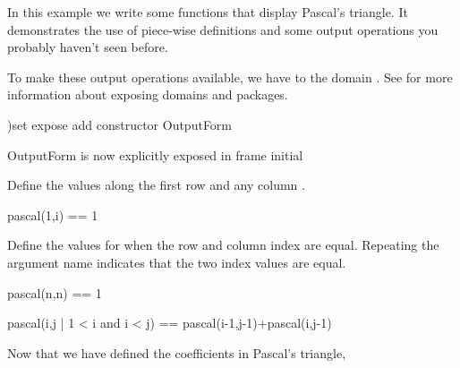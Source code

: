 
In this example we write some functions that display
Pascal's triangle.
It demonstrates the use of piece-wise definitions and some output
operations you probably haven't seen before.

\begin{xtc}
\begin{xtccomment}
To make these output operations
available, we have to  the domain
.
See  for more information about exposing domains
and packages.
\end{xtccomment}
\begin{spadsrc}
)set expose add constructor OutputForm 
\end{spadsrc}
\begin{SysCmdOutput}
   OutputForm is now explicitly exposed in frame initial 
\end{SysCmdOutput}
\end{xtc}
\begin{xtc}
\begin{xtccomment}
Define the values along the first
row and any column .
\end{xtccomment}
\begin{spadsrc}
pascal(1,i) == 1 
\end{spadsrc}
\end{xtc}
\begin{xtc}
\begin{xtccomment}
Define the values for when the row
and column index  are equal.
Repeating the argument name indicates that
the two index values are equal.
\end{xtccomment}
\begin{spadsrc}
pascal(n,n) == 1 
\end{spadsrc}
\end{xtc}
\begin{xtc}
\begin{xtccomment}
\end{xtccomment}
\begin{spadsrc}
pascal(i,j | 1 < i and i < j) ==
   pascal(i-1,j-1)+pascal(i,j-1)
\end{spadsrc}
\end{xtc}
Now that we have defined the coefficients in Pascal's triangle,
